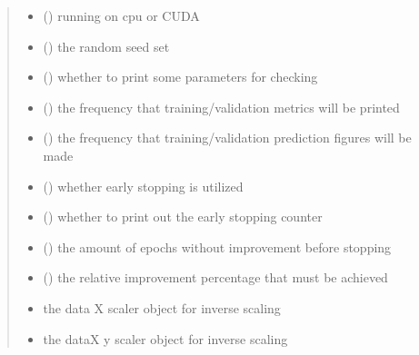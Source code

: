 \documentclass[letterpaper,10pt,english]{sphinxmanual}
\begin{document}
\begin{fulllineitems}
\begin{quote}
\begin{description}
\begin{itemize}
\item {} 
 () \textendash{} running on cpu or CUDA

\item {} 
 () \textendash{} the random seed set

\item {} 
 () \textendash{} whether to print some parameters for checking

\item {} 
 () \textendash{} the frequency that training/validation metrics will be printed

\item {} 
 () \textendash{} the frequency that training/validation prediction figures will be made

\item {} 
 () \textendash{} whether early stopping is utilized

\item {} 
 () \textendash{} whether to print out the early stopping counter

\item {} 
 () \textendash{} the amount of epochs without improvement before stopping

\item {} 
 () \textendash{} the relative improvement percentage that must be achieved

\item {} 
 \textendash{} the data X scaler object for inverse scaling

\item {} 
 \textendash{} the dataX y scaler object for inverse scaling


\end{itemize}
\end{description}
\end{quote}
\end{fulllineitems}
\end{document}
